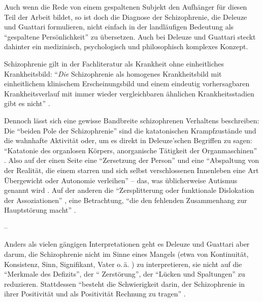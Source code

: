 \documentclass[12pt,
               DIV13,
               paper=a4,
               twoside=false,
               onehalfspacing,
               bibliography=totoc,
               toc=graduated,
               draft,
               ]{scrartcl}
\newcommand{\pc}[2]{\parencite[#1]{#2}}
\newcommand{\vgl}[2]{\parencite[vgl.][#1]{#2}}
\begin{document}
Auch wenn die Rede von einem gespaltenen Subjekt den Aufhänger für
diesen Teil der Arbeit bildet, so ist doch die Diagnose der
Schizophrenie, die Deleuze und Guattari formulieren, nicht einfach in
der landläufigen Bedeutung als "`gespaltene Persönlichkeit"' zu
übersetzen. Auch bei Deleuze und Guattari steckt dahinter ein
medizinisch, psychologisch und philosophisch komplexes Konzept.

Schizophrenie gilt in der Fachliteratur als Krankheit ohne
einheitliches Krankheitsbild: "`\emph{Die} Schizophrenie als homogenes
Krankheitsbild mit einheitlichem klinischem Erscheinungsbild und einem
eindeutig vorhersagbaren Krankheitsverlauf mit immer wieder
vergleichbaren ähnlichen Krankheitsstadien gibt es nicht"'
\pc{799}{psych}.

Dennoch lässt sich eine gewisse Bandbreite schizophrenen Verhaltens
beschreiben: Die "`beiden Pole der Schizophrenie"' \pc{21}{schizg}
sind die katatonischen Krampfzustände und die wahnhafte Aktivität
oder, um es direkt in Deleuze'schen Begriffen zu sagen: "`Katatonie
des organlosen Körpers, anorganische Tätigkeit der Organmaschinen"'
\pc{21}{schizg}. Also auf der einen Seite eine "`Zersetzung der
Person"' und eine "`Abspaltung von der Realität, die einem starren und
sich selbst verschlossenen Innenleben eine Art Übergewicht oder
Autonomie verleihen"' \pc{23}{schizg} -- das, was üblicherweise
Autismus genannt wird \vgl{801}{psych}. Auf der anderen die
"`Zersplitterung oder funktionale Dislokation der Assoziationen"'
\pc{23}{schizg}, eine Betrachtung, "`die den fehlenden Zusammenhang
zur Hauptstörung macht"' \pc{23}{schizg}.

--

Anders als vielen gängigen Interpretationen geht es Deleuze und
Guattari aber darum, die Schizophrenie nicht im Sinne eines Mangels
(etwa von Kontinuität, Konsistenz, Sinn, Signifikant, Vater o.\,ä.
\vgl{xx}{schizg}) zu interpretieren, sie nicht auf die "`Merkmale des
Defizits"', der "` Zerstörung"', der "`Lücken und Spaltungen"'
\pc{24}{schizg} zu reduzieren. Stattdessen "`besteht die Schwierigkeit
darin, der Schizophrenie in ihrer Positivität und als Positivität
Rechnung zu tragen"' \pc{24}{schizg}.
\end{document}
